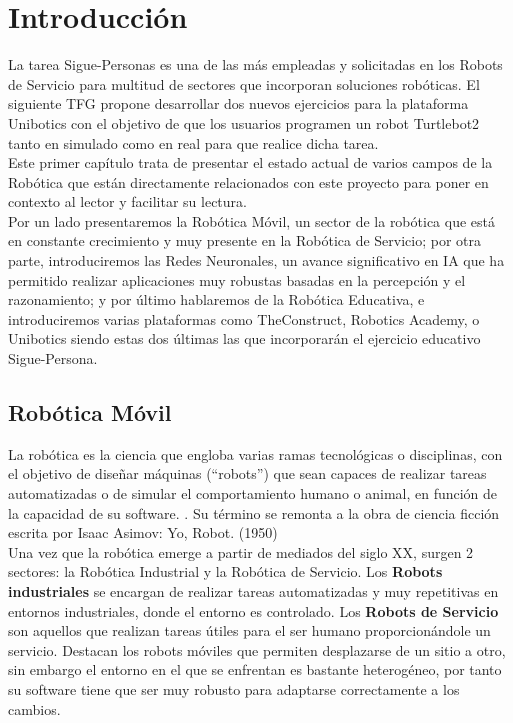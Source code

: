 \chapter{Introducción}
\label{cap:capitulo1}
\setcounter{page}{1}

La tarea Sigue-Personas es una de las más empleadas y solicitadas en los Robots de Servicio para multitud de sectores que incorporan soluciones robóticas. El siguiente TFG propone desarrollar dos nuevos ejercicios para la plataforma Unibotics con el objetivo de que los usuarios programen un robot Turtlebot2 tanto en simulado como en real para que realice dicha tarea.\\

Este primer capítulo trata de presentar el estado actual de varios campos de la Robótica que están directamente relacionados con este proyecto para poner en contexto al lector y facilitar su lectura.\\

Por un lado presentaremos la Robótica Móvil, un sector de la robótica que está en constante crecimiento y muy presente en la Robótica de Servicio; por otra parte, introduciremos las Redes Neuronales, un avance significativo en IA que ha permitido realizar aplicaciones muy robustas basadas en la percepción y el razonamiento; y por último hablaremos de la Robótica Educativa, e introduciremos varias plataformas como TheConstruct, Robotics Academy, o Unibotics siendo estas dos últimas las que incorporarán el ejercicio educativo Sigue-Persona.



\section{Robótica Móvil}
\label{sec:robotica_movil}

La robótica es la ciencia que engloba varias ramas tecnológicas o disciplinas, con el objetivo de diseñar máquinas (``robots'') que sean capaces de realizar tareas automatizadas o de simular el comportamiento humano o animal, en función de la capacidad de su software. \cite{revistaderobots}. Su término se remonta a la obra de ciencia ficción escrita por Isaac Asimov: Yo, Robot. (1950)\\

Una vez que la robótica emerge a partir de mediados del siglo XX, surgen 2 sectores: la Robótica Industrial y la Robótica de Servicio. Los \textbf{Robots industriales} se encargan de realizar tareas automatizadas y muy repetitivas en entornos industriales, donde el entorno es controlado. Los \textbf{Robots de Servicio} son aquellos que realizan tareas útiles para el ser humano proporcionándole un servicio. Destacan los robots móviles que permiten desplazarse de un sitio a otro, sin embargo el entorno en el que se enfrentan es bastante heterogéneo, por tanto su software tiene que ser muy robusto para adaptarse correctamente a los cambios.\\

